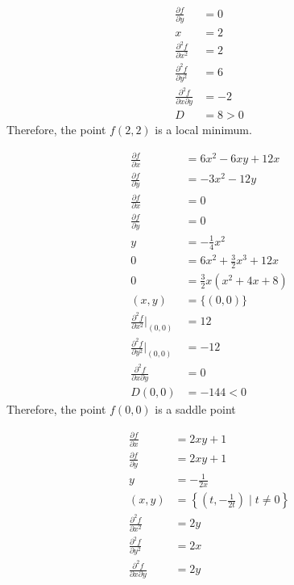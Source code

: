 \documentclass[8pt]{extarticle}
\begin{document}
\begin{problem}{15.1}
\begin{description}[font=\normalfont]
\begin{align*}
          \frac{\partial f}{\partial y} &= 0\\
          x &= 2\\
          \frac{\partial^2 f}{\partial x^2} &= 2\\
          \frac{\partial^2f}{\partial y^2} &= 6\\
          \frac{\partial^2 f}{\partial x \partial y} &= -2\\
          D &= 8 > 0
        \end{align*}
        Therefore, the point $f(2,2)$ is a local minimum.
      \item[20:]
        \begin{align*}
          \frac{\partial f}{\partial x} &= 6x^2 - 6xy + 12x\\
          \frac{\partial f}{\partial y} &= -3x^2 - 12y\\
          \frac{\partial f}{\partial x} &= 0\\
          \frac{\partial f}{\partial y} &= 0\\
          y &= -\frac{1}{4}x^2\\
          0 &= 6x^2 + \frac{3}{2}x^3 + 12x\\
          0 &= \frac{3}{2}x\left(x^2 + 4x + 8\right)\\
          (x,y) &= \{(0,0)\}\\
          \frac{\partial^2 f}{\partial x^2}\biggr\vert_{(0,0)} &= 12\\
          \frac{\partial^2f}{\partial y^2}\biggr\vert_{(0,0)} &= -12\\
          \frac{\partial^2f}{\partial x \partial y} &= 0\\
          D(0,0) &= -144 < 0
        \end{align*}
        Therefore, the point $f(0,0)$ is a saddle point
      \item[24:]
        \begin{align*}
          \frac{\partial f}{\partial x} &= 2xy + 1\\
          \frac{\partial f}{\partial y} &= 2xy + 1\\
          y &= -\frac{1}{2x}\\
          (x,y) &= \left\{\left(t,-\frac{1}{2t}\right) \mid t\neq 0 \right\}\\
          \frac{\partial^2 f}{\partial x^2} &= 2y\\
          \frac{\partial^2f}{\partial y^2} &= 2x\\
          \frac{\partial^2f}{\partial x \partial y} &= 2y\\

\end{align*}
\end{description}
\end{problem}
\end{document}
